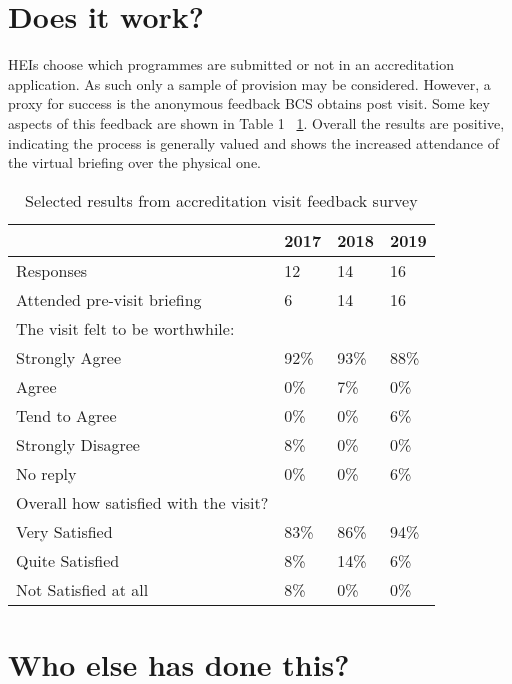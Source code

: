 \documentclass[sigconf]{acmart}
\begin{document}
\section {Does it work?}

HEIs choose which programmes are submitted or not in an accreditation application. As such only a sample of provision may be considered. However, a proxy for success is the anonymous feedback BCS obtains post visit. Some key aspects of this feedback are shown in Table 1 ~\ref{table:1}. Overall the results are positive, indicating the process is generally valued and shows the increased attendance of the virtual briefing over the physical one.

\begin{table}[h!]
  \caption{Selected results from accreditation visit feedback survey}
  \label{table:1}
\begin{tabular}{ | p{5cm}|p{.75cm}|p{.75cm} |p{.75cm} |}
\hline
 & 2017 & 2018 & 2019   \\ \hline
Responses & 12 & 14 & 16   \\
\hline
Attended pre-visit briefing & 6 & 14 & 16   \\
\hline
The visit felt to be worthwhile: & & &  \\
Strongly Agree &92\% & 93\% &88\% \\
Agree &0\% & 7\% &0\% \\
Tend to Agree &0\% & 0\% &6\% \\
Strongly Disagree &8\% & 0\% &0\% \\
No reply &0\% & 0\% &6\% \\
\hline
Overall how satisfied with the visit? & & &  \\
Very Satisfied &83\% & 86\% &94\% \\
Quite Satisfied &8\% & 14\% &6\% \\
Not Satisfied at all &8\% & 0\% &0\% \\
\hline

\end{tabular}%
\end{table}

\section {Who else has done this?}	
\end{document}
